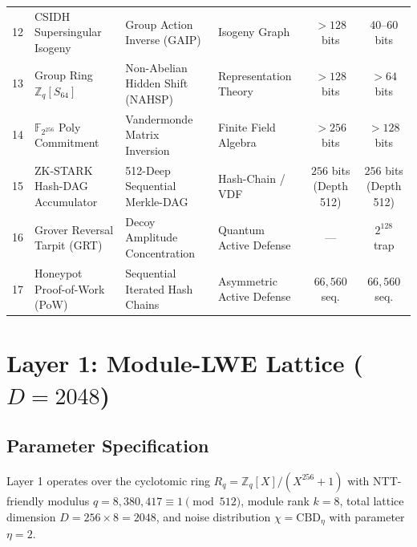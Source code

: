 \documentclass{ieeeaccess}
\newcommand{\Z}{\mathbb{Z}}
\newcommand{\F}{\mathbb{F}}
\begin{document}
\begin{table}[!t]
\begin{tabular}{@{}c p{3.6cm} p{3.8cm} p{2.8cm} c c@{}}
12 & CSIDH Supersingular Isogeny     & Group Action Inverse (GAIP)       & Isogeny Graph                & $>128$ bits                 & $40$--$60$ bits            \\
13 & Group Ring $\Z_q[S_{64}]$       & Non-Abelian Hidden Shift (NAHSP)  & Representation Theory        & $>128$ bits                 & $>64$ bits                 \\
14 & $\F_{2^{256}}$ Poly Commitment  & Vandermonde Matrix Inversion      & Finite Field Algebra         & $>256$ bits                 & $>128$ bits                \\
15 & ZK-STARK Hash-DAG Accumulator   & 512-Deep Sequential Merkle-DAG    & Hash-Chain / VDF             & $256$ bits (Depth 512)      & $256$ bits (Depth 512)     \\
16 & Grover Reversal Tarpit (GRT)    & Decoy Amplitude Concentration     & Quantum Active Defense       & ---                         & $2^{128}$ trap             \\
17 & Honeypot Proof-of-Work (PoW)    & Sequential Iterated Hash Chains   & Asymmetric Active Defense    & $66{,}560$ seq.             & $66{,}560$ seq.            \\
\bottomrule
\end{tabular}
\end{table}

\section{Layer 1: Module-LWE Lattice ($D=2048$)}
\label{sec:L1}

\subsection{Parameter Specification}
Layer 1 operates over the cyclotomic ring $R_q = \Z_q[X]/(X^{256}+1)$ with NTT-friendly modulus $q = 8{,}380{,}417 \equiv 1 \pmod{512}$, module rank $k = 8$, total lattice dimension $D = 256 \times 8 = 2048$, and noise distribution $\chi = \mathrm{CBD}_\eta$ with parameter $\eta = 2$.
\end{document}
